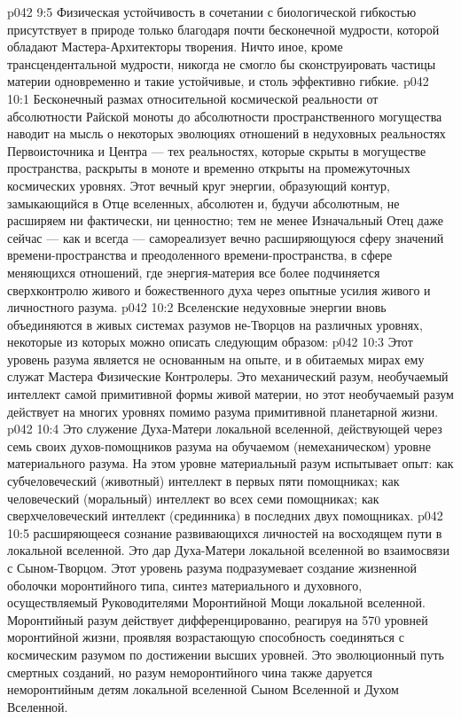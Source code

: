 \vs p042 9:5 Физическая устойчивость в сочетании с биологической гибкостью присутствует в природе только благодаря почти бесконечной мудрости, которой обладают Мастера\hyp{}Архитекторы творения. Ничто иное, кроме трансцендентальной мудрости, никогда не смогло бы сконструировать частицы материи одновременно и такие устойчивые, и столь эффективно гибкие.
\vs p042 10:1 Бесконечный размах относительной космической реальности от абсолютности Райской моноты до абсолютности пространственного могущества наводит на мысль о некоторых эволюциях отношений в недуховных реальностях Первоисточника и Центра --- тех реальностях, которые скрыты в могуществе пространства, раскрыты в моноте и временно открыты на промежуточных космических уровнях. Этот вечный круг энергии, образующий контур, замыкающийся в Отце вселенных, абсолютен и, будучи абсолютным, не расширяем ни фактически, ни ценностно; тем не менее Изначальный Отец даже сейчас --- как и всегда --- самореализует вечно расширяющуюся сферу значений времени\hyp{}пространства и преодоленного времени\hyp{}пространства, в сфере меняющихся отношений, где энергия\hyp{}материя все более подчиняется сверхконтролю живого и божественного духа через опытные усилия живого и личностного разума.
\vs p042 10:2 Вселенские недуховные энергии вновь объединяются в живых системах разумов не\hyp{}Творцов на различных уровнях, некоторые из которых можно описать следующим образом:
\vs p042 10:3 \bibnobreakspace {} Этот уровень разума является не основанным на опыте, и в обитаемых мирах ему служат Мастера Физические Контролеры. Это механический разум, необучаемый интеллект самой примитивной формы живой материи, но этот необучаемый разум действует на многих уровнях помимо разума примитивной планетарной жизни.
\vs p042 10:4 \bibnobreakspace {} Это служение Духа\hyp{}Матери локальной вселенной, действующей через семь своих духов\hyp{}помощников разума на обучаемом (немеханическом) уровне материального разума. На этом уровне материальный разум испытывает опыт: как субчеловеческий (животный) интеллект в первых пяти помощниках; как человеческий (моральный) интеллект во всех семи помощниках; как сверхчеловеческий интеллект (срединника) в последних двух помощниках.
\vs p042 10:5 \bibnobreakspace {} расширяющееся сознание развивающихся личностей на восходящем пути в локальной вселенной. Это дар Духа\hyp{}Матери локальной вселенной во взаимосвязи с Сыном\hyp{}Творцом. Этот уровень разума подразумевает создание жизненной оболочки моронтийного типа, синтез материального и духовного, осуществляемый Руководителями Моронтийной Мощи локальной вселенной. Моронтийный разум действует дифференцированно, реагируя на 570 уровней моронтийной жизни, проявляя возрастающую способность соединяться с космическим разумом по достижении высших уровней. Это эволюционный путь смертных созданий, но разум неморонтийного чина также даруется неморонтийным детям локальной вселенной Сыном Вселенной и Духом Вселенной.
